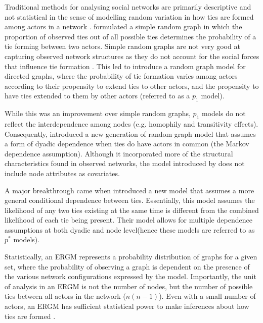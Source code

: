 Traditional methods for analysing social networks are primarily descriptive and not statistical in the sense of modelling random variation in how ties are formed among actors in a network \citep{harris2013introduction}. \citet{erdos1959random} formulated a simple random graph in which the proportion of observed ties out of all possible ties determines the probability of a tie forming between two actors. Simple random graphs are not very good at capturing observed network structures as they do not account for the social forces that influence tie formation \citep{harris2013introduction}. This led  \citet{holland1981exponential} to introduce a random graph model for directed graphs, where the probability of tie formation varies among actors according to their propensity to extend ties to other actors, and the propensity to have ties extended to them by other actors (referred to as a $p_1$ model). \medskip

While this was an improvement over simple random graphs, $p_1$ models do not reflect the interdependence among nodes (e.g. homophily and transitivity effects). Consequently,  \citet{frank1986markov} introduced a new generation of random graph model that assumes a form of dyadic dependence when ties do have actors in common (the Markov dependence assumption). Although it incorporated more of the structural characteristics found in observed networks, the model introduced by \citet{frank1986markov} does not include node attributes as covariates. \medskip

A major breakthrough came when \citet{wasserman1996logit} introduced a new model that assumes a more general conditional dependence between ties. Essentially, this model assumes the likelihood of any two ties existing at the same time is different from the combined likelihood of each tie being present. Their model allows for multiple dependence assumptions at both dyadic and node level(hence these models are referred to as $p^*$ models). \medskip

Statistically, an ERGM represents a probability distribution of graphs for a given set, where the probability of observing a graph is dependent on the presence of the various network configurations expressed by the model. Importantly, the unit of analysis in an ERGM is not the number of nodes, but the number of possible ties between all actors in the network ($n(n-1)$). Even with a small number of actors, an ERGM has sufficient statistical power to make inferences about how ties are formed \citep{lusher2013exponential}. \medskip

